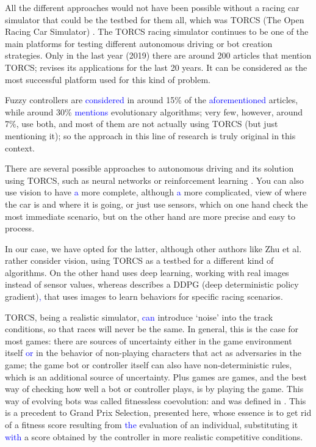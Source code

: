 \documentclass[10pt,journal,compsoc]{IEEEtran}
\begin{document}

All the different approaches would not have been possible without a
racing car simulator that could be the testbed for them all, which was
TORCS (The Open Racing Car Simulator) \cite{torcs4}. The TORCS racing simulator
continues to be one of the main platforms for testing different autonomous driving or bot creation strategies. Only in the last year (2019) there are around 200 articles that mention TORCS; \cite{badue2019selfdriving} revises its applications for the last 20 years. It can be considered as the most successful platform used for this kind of problem.

Fuzzy controllers are \textcolor{blue}{considered} in around 15\% of the \textcolor{blue}{aforementioned} articles, while around 30\% \textcolor{blue}{mentions} evolutionary algorithms; very few, however, around 7\%, use both, and most of them are not actually using TORCS (but just mentioning it); so the approach in this line of research is truly original in this context.

There are several possible approaches to autonomous driving and its
solution using TORCS, such as neural networks or reinforcement learning \cite{abuzekry2comparative}. 
You can also use vision to have \textcolor{blue}{a} more complete, although \textcolor{blue}{a} more complicated, view of where the car is and where it is going, or just use sensors, which on one hand check the most immediate scenario, but on the other hand are more precise and easy to process.

In our case, we have opted for the latter, although other authors like Zhu et al. \cite{zhu2019vision} rather
consider vision, using TORCS as a testbed for a different kind of
algorithms. On the other hand \cite{8833873} uses deep learning, working with real images instead of sensor values, whereas \cite{Kaushik_2018_ECCV_Workshops} describes a DDPG (deep deterministic policy gradient)\textcolor{blue}{,} that uses images to learn behaviors for specific racing scenarios.

TORCS, being a realistic simulator, \textcolor{blue}{can} introduce `noise' into
the track conditions, so that races will never be the same. In
general, this is the case for most games: there are sources of
uncertainty either in the game environment itself \textcolor{blue}{or} in the behavior
of non-playing characters that act as adversaries in the game; the
game bot or controller itself can also have non-deterministic rules,
which is an additional source of uncertainty. Plus games are games,
and the best way of checking how well a bot or controller plays, is by
playing the game. This way of evolving bots was called fitnessless
coevolution: and was defined in
\cite{Jaskowski:2008:FC:1389095.1389161}. This is a precedent to
Grand Prix Selection, presented here, whose essence is
to get rid of a fitness score resulting from \textcolor{blue}{the} evaluation of an individual, substituting it \textcolor{blue}{with} a score obtained by the controller in
more realistic competitive conditions.
\end{document}
